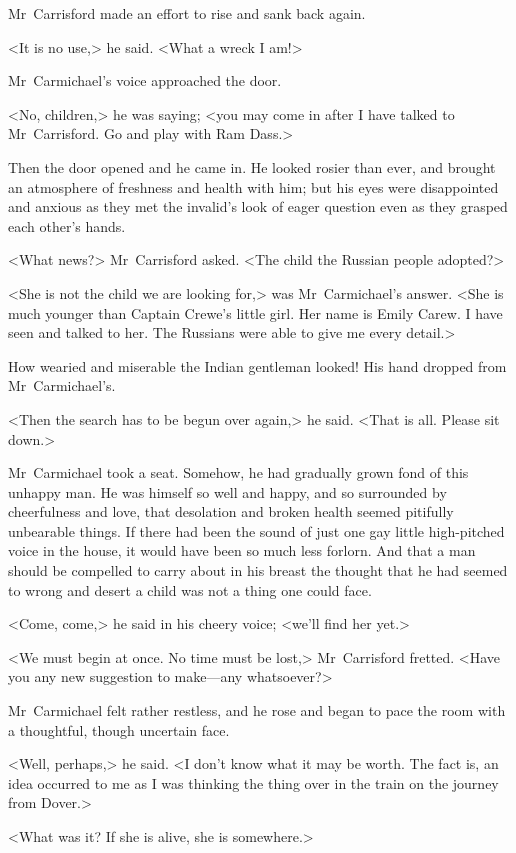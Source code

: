 Mr~Carrisford made an effort to rise and sank back again.

<It is no use,> he said. <What a wreck I am!>

Mr~Carmichael's voice approached the door.

<No, children,> he was saying; <you may come in after I have talked to Mr~Carrisford. Go and play with Ram Dass.>

Then the door opened and he came in. He looked rosier than ever, and brought an atmosphere of freshness and health with him; but his eyes were disappointed and anxious as they met the invalid's look of eager question even as they grasped each other's hands.

<What news?> Mr~Carrisford asked. <The child the Russian people adopted?>

<She is not the child we are looking for,> was Mr~Carmichael's answer. <She is much younger than Captain Crewe's little girl. Her name is Emily Carew. I have seen and talked to her. The Russians were able to give me every detail.>

How wearied and miserable the Indian gentleman looked! His hand dropped from Mr~Carmichael's.

<Then the search has to be begun over again,> he said. <That is all. Please sit down.>

Mr~Carmichael took a seat. Somehow, he had gradually grown fond of this unhappy man. He was himself so well and happy, and so surrounded by cheerfulness and love, that desolation and broken health seemed pitifully unbearable things. If there had been the sound of just one gay little high-pitched voice in the house, it would have been so much less forlorn. And that a man should be compelled to carry about in his breast the thought that he had seemed to wrong and desert a child was not a thing one could face.

<Come, come,> he said in his cheery voice; <we'll find her yet.>

<We must begin at once. No time must be lost,> Mr~Carrisford fretted. <Have you any new suggestion to make—any whatsoever?>

Mr~Carmichael felt rather restless, and he rose and began to pace the room with a thoughtful, though uncertain face.

<Well, perhaps,> he said. <I don't know what it may be worth. The fact is, an idea occurred to me as I was thinking the thing over in the train on the journey from Dover.>

<What was it? If she is alive, she is somewhere.>

